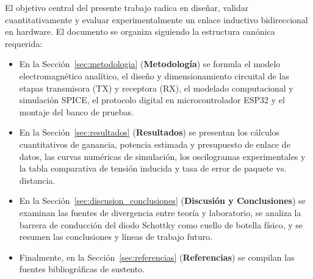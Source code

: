 El objetivo central del presente trabajo radica en diseñar, validar cuantitativamente y evaluar experimentalmente un enlace inductivo bidireccional en hardware. El documento se organiza siguiendo la estructura canónica requerida:
\begin{itemize}
    \item En la Sección~\ref{sec:metodologia} (\textbf{Metodología}) se formula el modelo electromagnético analítico, el diseño y dimensionamiento circuital de las etapas transmisora (TX) y receptora (RX), el modelado computacional y simulación SPICE, el protocolo digital en microcontrolador ESP32 y el montaje del banco de pruebas.
    \item En la Sección~\ref{sec:resultados} (\textbf{Resultados}) se presentan los cálculos cuantitativos de ganancia, potencia estimada y presupuesto de enlace de datos, las curvas numéricas de simulación, los oscilogramas experimentales y la tabla comparativa de tensión inducida y tasa de error de paquete vs. distancia.
    \item En la Sección~\ref{sec:discusion_conclusiones} (\textbf{Discusión y Conclusiones}) se examinan las fuentes de divergencia entre teoría y laboratorio, se analiza la barrera de conducción del diodo Schottky como cuello de botella físico, y se resumen las conclusiones y líneas de trabajo futuro.
    \item Finalmente, en la Sección~\ref{sec:referencias} (\textbf{Referencias}) se compilan las fuentes bibliográficas de sustento.
\end{itemize}
